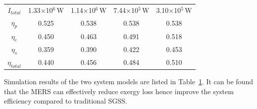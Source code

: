 \begin{table}[htbp]
\begin{center}
\begin{tabular}{ccccc}
		$\dot{I}_{total}$    &    1.33$\times$10$^6\,\mathrm{W}$    &  1.14$\times$10$^6\,\mathrm{W}$  &	7.44$\times$10$^5\,\mathrm{W}$	&	3.10$\times$10$^5\,\mathrm{W}$\\
		$\eta_p$    &    0.525    &	0.538	&    0.538	&	0.538\\
		$\eta_e$    &    0.450    &	0.463	& 0.491	&	0.518\\
		$\eta_s$    &    0.359    &  0.390	&  0.422	&	0.453\\
		$\eta_{total}$    &    0.440   &	0.456	&    0.484	&	0.510\\
		\bottomrule
	\end{tabular}
	\end{center}
	\label{tab:comparison}
\end{table}
Simulation results of the two system models are listed in Table~\ref{tab:comparison}. It can be found that the MERS can effectively reduce exergy loss hence improve the system efficiency compared to traditional SGSS.



